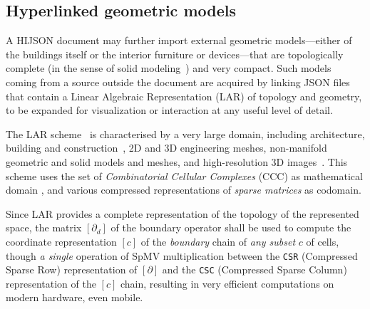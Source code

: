\subsection{Hyperlinked geometric models}\label{optional-lar}

A HIJSON document may further import external geometric models---either of the buildings itself or the interior furniture or devices---that are topologically complete (in the sense of solid modeling~\cite{Requicha:1980:RRS:356827.356833}) and very compact. 
Such models coming from a source outside the document are acquired by linking JSON files that contain a Linear Algebraic Representation (LAR) of topology and geometry, to be expanded for visualization or interaction at any useful level of detail. 

The LAR scheme~\cite{Dicarlo:2014:TNL:2543138.2543294} is characterised by a very large domain, including architecture, building and construction~\cite{paoluzziMS:2014}, 2D and 3D engineering meshes, non-manifold geometric and solid models and meshes, and high-resolution 3D images~\cite{cadanda:2015}. This scheme uses the set of \emph{Combinatorial Cellular Complexes} (CCC) as mathematical domain
\cite{Basak:2010}, and various compressed representations of \emph{sparse matrices} \cite{gemmexp} as codomain. 

Since LAR provides a complete representation of the topology of the represented space,
the matrix $[\partial_d]$ of the boundary operator shall be used to compute the coordinate representation $[c]$ of the \emph{boundary} chain of \emph{any subset} $c$ of cells, though \emph{a single} operation of SpMV multiplication \cite{gemmexp} between the \texttt{CSR} (Compressed Sparse Row) representation of $[\partial]$ and the \texttt{CSC} (Compressed Sparse Column) representation of the $[c]$ chain, resulting in very efficient computations on modern hardware, even mobile.


